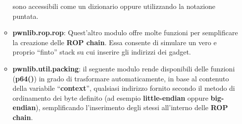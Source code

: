 \begin{itemize}
\begin{itemize}
                      sono accessibili come un dizionario oppure utilizzando la notazione puntata.
                      \item \textbf{pwnlib.rop.rop}: Quest'altro modulo offre molte funzioni per semplificare la creazione delle \textbf{ROP chain}. Essa consente di simulare un vero e proprio ``finto'' stack su cui inserire gli indirizzi dei gadget.
                      \item \textbf{pwnlib.util.packing}: il seguente modulo rende disponibili delle funzioni (\textbf{p64()}) in grado di trasformare automaticamente, in base al contenuto della variabile ``\textbf{context}'', qualsiasi indirizzo fornito secondo il metodo di ordinamento dei byte definito (ad esempio \textbf{little-endian} oppure \textbf{big-endian}),
                      semplificando l'inserimento degli stessi all'interno delle \textbf{ROP chain}.
              \end{itemize}
\end{itemize}

